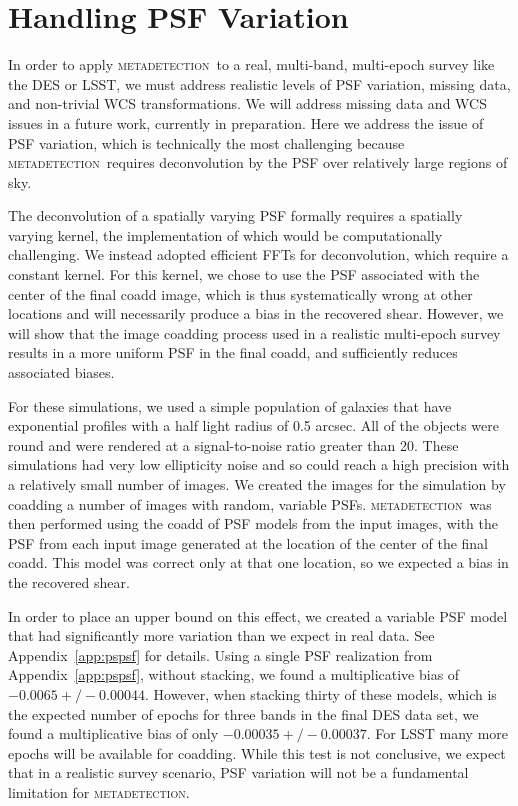\documentclass[iop, appendixfloats, numberedappendix, apj]{emulateapj}
\newcommand{\mdet}{\textsc{metadetection}}
\begin{document}
\section{Handling PSF Variation}
\label{sec:psfvar}

In order to apply \mdet\ to a real, multi-band, multi-epoch survey like the DES
or LSST, we must address realistic levels of PSF variation, missing data, and
non-trivial WCS transformations. We will address missing data and WCS issues in
a future work, currently in preparation. Here we address the issue of PSF
variation, which is technically the most challenging because \mdet\ requires
deconvolution by the PSF over relatively large regions of sky.

The deconvolution of a spatially varying PSF formally requires a spatially
varying kernel, the implementation of which would be computationally
challenging.  We instead adopted efficient FFTs for deconvolution, which require
a constant kernel.  For this kernel, we chose to use the PSF associated with
the center of the final coadd image, which is thus systematically wrong at
other locations and will necessarily produce a bias in the recovered shear.
However, we will show that the image coadding process used in a realistic
multi-epoch survey results in a more uniform PSF in the final coadd, and
sufficiently reduces associated biases.

For these simulations, we used a simple population of galaxies that have
exponential profiles with a half light radius of 0.5 arcsec. All of the objects
were round and were rendered at a signal-to-noise ratio greater than 20. These
simulations had very low ellipticity noise and so could reach a high precision
with a relatively small number of images. We created the images for the
simulation by coadding a number of images with random, variable PSFs.  \mdet\
was then performed using the coadd of PSF models from the input images, with
the PSF from each input image generated at the location of the center of the
final coadd.  This model was correct only at that one location, so we expected
a bias in the recovered shear.

In order to place an upper bound on this effect, we created a variable PSF
model that had significantly more variation than we expect in real data. See
Appendix~\ref{app:pspsf} for details.  Using a single PSF realization from
Appendix~\ref{app:pspsf}, without stacking, we found a multiplicative bias of
$-0.0065 +/- 0.00044$.  However, when stacking thirty of these models, which is
the expected number of epochs for three bands in the final DES data set, we
found a multiplicative bias of only $-0.00035 +/- 0.00037$.  For LSST many more
epochs will be available for coadding.   While this test is not conclusive, we
expect that in a realistic survey scenario, PSF variation will not be a
fundamental limitation for \mdet.
\end{document}
